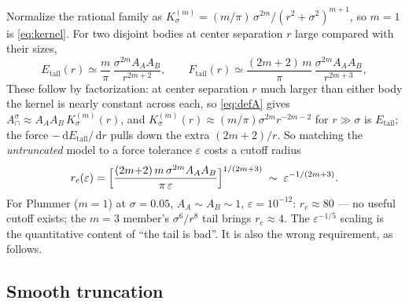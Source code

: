 \documentclass[11pt]{article}
\newcommand{\dd}{\,\mathrm{d}}
\newcommand{\Acap}{A^{\sigma}_{\cap}}
\begin{document}
Normalize the rational family as
$K^{(m)}_\sigma=(m/\pi)\,\sigma^{2m}/(r^2+\sigma^2)^{m+1}$, so $m{=}1$ is
\eqref{eq:kernel}.  For two disjoint bodies at center separation $r$ large compared
with their sizes,
\begin{equation}
  E_{\text{tail}}(r)\simeq\frac{m}{\pi}\,\frac{\sigma^{2m}A_AA_B}{r^{2m+2}},
  \qquad
  F_{\text{tail}}(r)\simeq\frac{(2m{+}2)\,m}{\pi}\,
  \frac{\sigma^{2m}A_AA_B}{r^{2m+3}},
  \label{eq:tailforce}
\end{equation}
These follow by factorization: at center separation $r$ much larger than either body
the kernel is nearly constant across each, so \eqref{eq:defA} gives
$\Acap\approx A_AA_B\,K^{(m)}_\sigma(r)$, and
$K^{(m)}_\sigma(r)\approx(m/\pi)\sigma^{2m}r^{-2m-2}$ for $r\gg\sigma$ is
$E_{\text{tail}}$; the force $-\dd E_{\text{tail}}/\dd r$ pulls down the extra
$(2m{+}2)/r$.  So matching the \emph{untruncated} model to a force tolerance
$\varepsilon$ costs a cutoff radius
\begin{equation}
  r_c(\varepsilon)=\Bigl[\frac{(2m{+}2)\,m\,\sigma^{2m}A_AA_B}{\pi\,\varepsilon}
  \Bigr]^{1/(2m+3)}\;\sim\;\varepsilon^{-1/(2m+3)} .
  \label{eq:rc}
\end{equation}
For Plummer ($m{=}1$) at $\sigma=0.05$, $A_A\!\sim\!A_B\!\sim\!1$,
$\varepsilon=10^{-12}$: $r_c\approx80$ --- no useful cutoff exists; the $m{=}3$
member's $\sigma^6/r^8$ tail brings $r_c\approx4$.  The $\varepsilon^{-1/5}$ scaling
is the quantitative content of ``the tail is bad''.  It is also the wrong
requirement, as follows.

\subsection{Smooth truncation}
\label{sec:switch}
\end{document}
